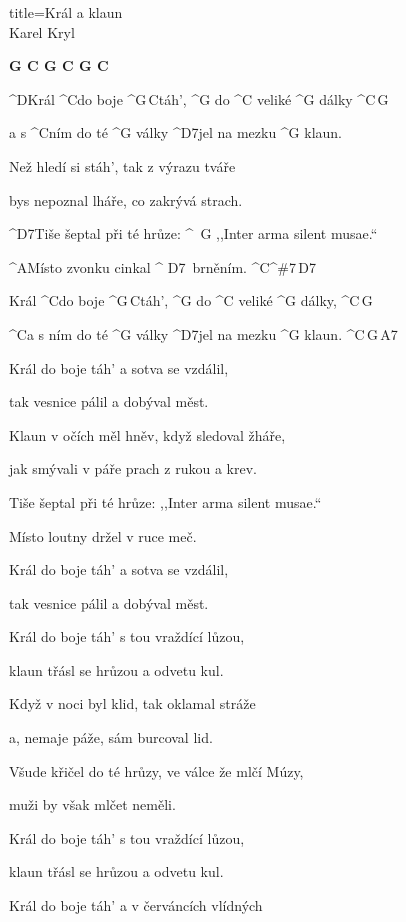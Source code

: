 \begin{song}{title=\predtitle\centering Král a klaun \\\large Karel Kryl  \vspace*{-0.8cm}}  %
\begin{centerjustified}

\predehra
\textbf{G C G C G C}

\sloka 
	^{D}Král ^{C}do boje ^{G\,C}táh', ^{G} do ^{C \z}veliké ^{G \z}dálky ^{C\,G}

	a s ^{C}ním do té ^{G \z}války ^{D7}jel na mezku ^{G \z}klaun.

	Než hledí si stáh', tak z výrazu tváře

	bys nepoznal lháře, co zakrývá strach.

	^{D7}Tiše šeptal při té hrůze: ^{\, G \z},,Inter arma silent musae.``

	^{A}Místo zvonku cinkal ^{ \z D7 \,}brněním. ^{C^{\#}7\,D7}

	Král ^{C}do boje ^{G\,C}táh', ^{G} do ^{C \z}veliké ^{G \z}dálky,  ^{C\,G}

	^{C}a s ním do té ^{G \z}války ^{D7}jel na mezku ^{G \z}klaun.  ^{C\,G\,A7}

\sloka
	Král do boje táh' a sotva se vzdálil,
	
	tak vesnice pálil a dobýval měst.

	Klaun v očích měl hněv, když sledoval žháře,

	jak smývali v páře prach z rukou a krev.
	
	Tiše šeptal při té hrůze: ,,Inter arma silent musae.``
	
	Místo loutny držel v ruce meč.

	Král do boje táh' a sotva se vzdálil,
   
	tak vesnice pálil a dobýval měst.

\sloka
	Král do boje táh' s tou vraždící lůzou,
	
	klaun třásl se hrůzou a odvetu kul.

	Když v noci byl klid, tak oklamal stráže
	
	a, nemaje páže, sám burcoval lid.
	
	Všude křičel do té hrůzy, ve válce že mlčí Múzy,
	
	muži by však mlčet neměli.

	Král do boje táh' s tou vraždící lůzou,

	klaun třásl se hrůzou a odvetu kul.

\sloka
	Král do boje táh' a v červáncích vlídných


\end{centerjustified}
\end{song}
